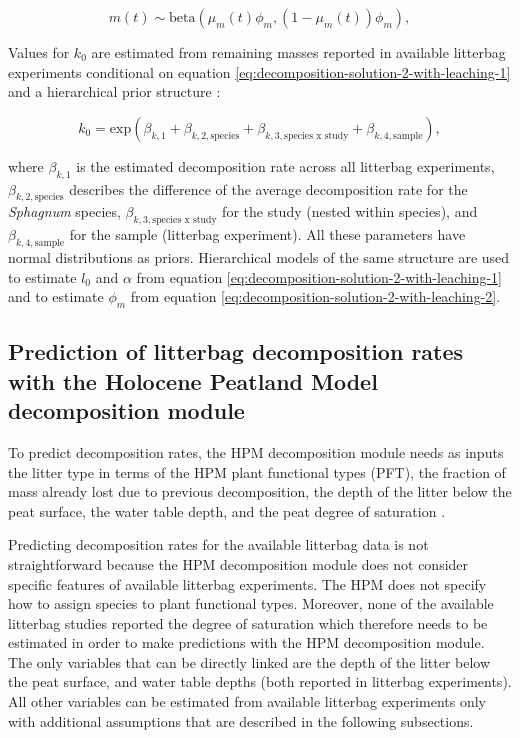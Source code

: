 \documentclass[esd, manuscript]{copernicus}
\begin{document}
\begin{equation}
m(t) \sim \text{beta}(\mu_m(t) \phi_m, (1 - \mu_m(t)) \phi_m)
\label{eq:decomposition-solution-2-with-leaching-2},
\end{equation}

Values for \(k_0\) are estimated from remaining masses reported in available litterbag experiments conditional on equation \eqref{eq:decomposition-solution-2-with-leaching-1} and a hierarchical prior structure \citep{Teickner.2025}:

\begin{equation}
k_0 =  \text{exp}(\beta_{k,1} + \beta_{k,2,\text{species}} + \beta_{k,3,\text{species x study}} + \beta_{k,4,\text{sample}}),
\label{eq:model-link-2}
\end{equation}

where \(\beta_{k,1}\) is the estimated decomposition rate across all litterbag experiments, \(\beta_{k,2,\text{species}}\) describes the difference of the average decomposition rate for the \emph{Sphagnum} species, \(\beta_{k,3,\text{species x study}}\) for the study (nested within species), and \(\beta_{k,4,\text{sample}}\) for the sample (litterbag experiment). All these parameters have normal distributions as priors. Hierarchical models of the same structure are used to estimate \(l_0\) and \(\alpha\) from equation \eqref{eq:decomposition-solution-2-with-leaching-1} and to estimate \(\phi_m\) from equation \eqref{eq:decomposition-solution-2-with-leaching-2}.

\hypertarget{sdm-003-methods-2}{%
\subsection{Prediction of litterbag decomposition rates with the Holocene Peatland Model decomposition module}\label{sdm-003-methods-2}}

To predict decomposition rates, the HPM decomposition module needs as inputs the litter type in terms of the HPM plant functional types (PFT), the fraction of mass already lost due to previous decomposition, the depth of the litter below the peat surface, the water table depth, and the peat degree of saturation \citep{Frolking.2010}.

Predicting decomposition rates for the available litterbag data is not straightforward because the HPM decomposition module does not consider specific features of available litterbag experiments. The HPM does not specify how to assign species to plant functional types. Moreover, none of the available litterbag studies reported the degree of saturation which therefore needs to be estimated in order to make predictions with the HPM decomposition module. The only variables that can be directly linked are the depth of the litter below the peat surface, and water table depths (both reported in litterbag experiments). All other variables can be estimated from available litterbag experiments only with additional assumptions that are described in the following subsections.
\end{document}
